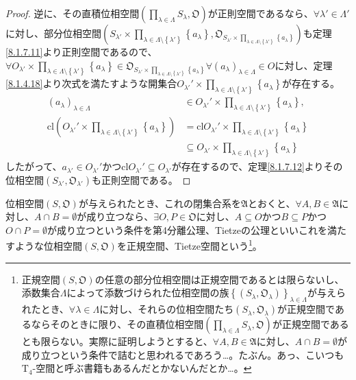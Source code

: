 \documentclass[dvipdfmx]{jsarticle}
\begin{document}
\begin{proof}
逆に、その直積位相空間$\left( \prod_{\lambda \in \varLambda} S_{\lambda},\mathfrak{O} \right)$が正則空間であるなら、$\forall\lambda' \in \varLambda'$に対し、部分位相空間$\left( S_{\lambda'} \times \prod_{\lambda \in \varLambda \setminus \left\{ \lambda' \right\}} \left\{ a_{\lambda} \right\},\mathfrak{O}_{S_{\lambda'} \times \prod_{\lambda \in \varLambda \setminus \left\{ \lambda' \right\}} \left\{ a_{\lambda} \right\}} \right)$も定理\ref{8.1.7.11}より正則空間であるので、$\forall O_{\lambda'} \times \prod_{\lambda \in \varLambda \setminus \left\{ \lambda' \right\}} \left\{ a_{\lambda} \right\} \in \mathfrak{O}_{S_{\lambda'} \times \prod_{\lambda \in \varLambda \setminus \left\{ \lambda' \right\}} \left\{ a_{\lambda} \right\}}\forall\left( a_{\lambda} \right)_{\lambda \in \varLambda} \in O$に対し、定理\ref{8.1.4.18}より次式を満たすような開集合$O_{\lambda'}' \times \prod_{\lambda \in \varLambda \setminus \left\{ \lambda' \right\}} \left\{ a_{\lambda} \right\}$が存在する。
\begin{align*}
\left( a_{\lambda} \right)_{\lambda \in \varLambda} &\in O_{\lambda'}' \times \prod_{\lambda \in \varLambda \setminus \left\{ \lambda' \right\}} \left\{ a_{\lambda} \right\},\\
{\mathrm{cl}}\left( O_{\lambda'}' \times \prod_{\lambda \in \varLambda \setminus \left\{ \lambda' \right\}} \left\{ a_{\lambda} \right\} \right) &= {\mathrm{cl}}O_{\lambda'}' \times \prod_{\lambda \in \varLambda \setminus \left\{ \lambda' \right\}} \left\{ a_{\lambda} \right\}\\
&\subseteq O_{\lambda'} \times \prod_{\lambda \in \varLambda \setminus \left\{ \lambda' \right\}} \left\{ a_{\lambda} \right\}
\end{align*}
したがって、$a_{\lambda'} \in O_{\lambda'}'$かつ${\mathrm{cl}}O_{\lambda'}' \subseteq O_{\lambda'}$が存在するので、定理\ref{8.1.7.12}よりその位相空間$\left( S_{\lambda'},\mathfrak{O}_{\lambda'} \right)$も正則空間である。
\end{proof}
\begin{dfn}
位相空間$\left( S,\mathfrak{O} \right)$が与えられたとき、これの閉集合系を$\mathfrak{A}$とおくと、$\forall A,B\in \mathfrak{A}$に対し、$A \cap B = \emptyset$が成り立つなら、$\exists O,P \in \mathfrak{O}$に対し、$A \subseteq O$かつ$B \subseteq P$かつ$O \cap P = \emptyset$が成り立つという条件を第4分離公理、Tietzeの公理といいこれを満たすような位相空間$\left( S,\mathfrak{O} \right)$を正規空間、Tietze空間という\footnote{正規空間$\left( S,\mathfrak{O} \right)$の任意の部分位相空間は正規空間であるとは限らないし、添数集合$\varLambda$によって添数づけられた位相空間の族$\left\{ \left( S_{\lambda},\mathfrak{O}_{\lambda} \right) \right\}_{\lambda \in \varLambda}$が与えられたとき、$\forall\lambda \in \varLambda$に対し、それらの位相空間たち$\left( S_{\lambda},\mathfrak{O}_{\lambda} \right)$が正規空間であるならそのときに限り、その直積位相空間$\left( \prod_{\lambda \in \varLambda} S_{\lambda},\mathfrak{O} \right)$が正規空間であるとも限らない。実際に証明しようとすると、$\forall A,B\in \mathfrak{A}$に対し、$A \cap B = \emptyset$が成り立つという条件で詰むと思われるであろう…。たぶん。あっ、こいつも$\mathrm{T}_{4}$-空間と呼ぶ書籍もあるんだとかないんだとか…。}。
\end{dfn}
\end{document}
